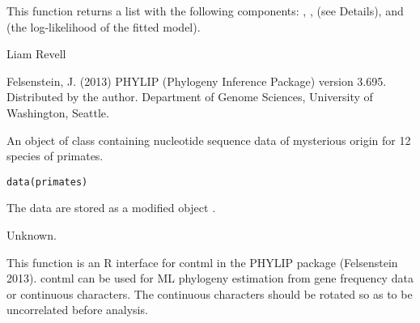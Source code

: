 \documentclass[a4paper]{book}
\begin{document}
%
\begin{Value}
This function returns a list with the following components: , ,  (see Details), and  (the log-likelihood of the fitted model).
\end{Value}
%
\begin{Author}\relax
Liam Revell 
\end{Author}
%
\begin{References}\relax
Felsenstein, J. (2013) PHYLIP (Phylogeny Inference Package) version 3.695. Distributed by the author. Department of Genome Sciences, University of Washington, Seattle.
\end{References}
%
\begin{SeeAlso}\relax
{}
\end{SeeAlso}
%
\begin{Examples}
\end{Examples}
%
\begin{Description}\relax
An object of class  containing nucleotide sequence data of mysterious origin for 12 species of primates.
\end{Description}
%
\begin{Usage}
\begin{verbatim}
data(primates)
\end{verbatim}
\end{Usage}
%
\begin{Format}
The data are stored as a modified object .
\end{Format}
%
\begin{Source}\relax
Unknown.
\end{Source}
%
\begin{Description}\relax
This function is an R interface for contml in the PHYLIP package (Felsenstein 2013). contml can be used for ML phylogeny estimation from gene frequency data or continuous characters. The continuous characters should be rotated so as to be uncorrelated before analysis.
\end{Description}
\end{document}
